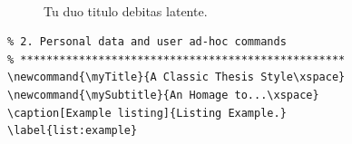 \begin{figure}[bth]
        \myfloatalign
         \quad
         \\
         \quad
        \caption[Tu duo titulo debitas latente]{Tu duo titulo debitas
        latente.}\label{fig:example-hw}
\end{figure}


\begin{lstlisting}[frame=lt,caption={Example Listing},label=list:example]
% **************************************************
% 2. Personal data and user ad-hoc commands
% **************************************************
\newcommand{\myTitle}{A Classic Thesis Style\xspace} 
\newcommand{\mySubtitle}{An Homage to...\xspace} 
\caption[Example listing]{Listing Example.}
\label{list:example}
\end{lstlisting}